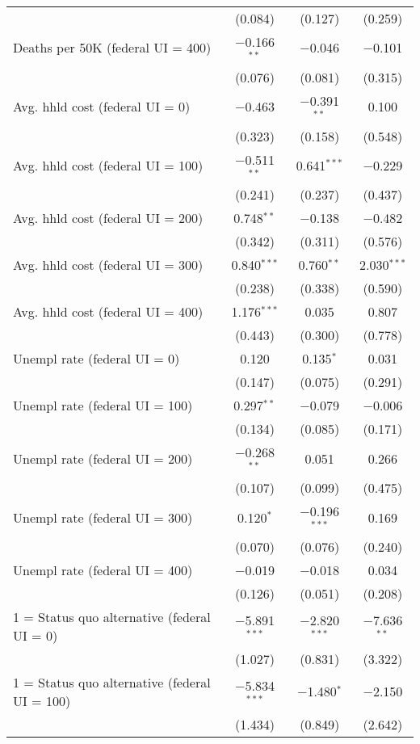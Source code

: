 \begin{table}[!htbp]
\begin{tabular}{@{\extracolsep{5pt}}lccc}
  & (0.084) & (0.127) & (0.259) \\ 
  Deaths per 50K (federal UI = 400) & $-$0.166$^{**}$ & $-$0.046 & $-$0.101 \\ 
  & (0.076) & (0.081) & (0.315) \\ 
  Avg. hhld cost (federal UI = 0) & $-$0.463 & $-$0.391$^{**}$ & 0.100 \\ 
  & (0.323) & (0.158) & (0.548) \\ 
  Avg. hhld cost (federal UI = 100) & $-$0.511$^{**}$ & 0.641$^{***}$ & $-$0.229 \\ 
  & (0.241) & (0.237) & (0.437) \\ 
  Avg. hhld cost (federal UI = 200) & 0.748$^{**}$ & $-$0.138 & $-$0.482 \\ 
  & (0.342) & (0.311) & (0.576) \\ 
  Avg. hhld cost (federal UI = 300) & 0.840$^{***}$ & 0.760$^{**}$ & 2.030$^{***}$ \\ 
  & (0.238) & (0.338) & (0.590) \\ 
  Avg. hhld cost (federal UI = 400) & 1.176$^{***}$ & 0.035 & 0.807 \\ 
  & (0.443) & (0.300) & (0.778) \\ 
  Unempl rate (federal UI = 0) & 0.120 & 0.135$^{*}$ & 0.031 \\ 
  & (0.147) & (0.075) & (0.291) \\ 
  Unempl rate (federal UI = 100) & 0.297$^{**}$ & $-$0.079 & $-$0.006 \\ 
  & (0.134) & (0.085) & (0.171) \\ 
  Unempl rate (federal UI = 200) & $-$0.268$^{**}$ & 0.051 & 0.266 \\ 
  & (0.107) & (0.099) & (0.475) \\ 
  Unempl rate (federal UI = 300) & 0.120$^{*}$ & $-$0.196$^{***}$ & 0.169 \\ 
  & (0.070) & (0.076) & (0.240) \\ 
  Unempl rate (federal UI = 400) & $-$0.019 & $-$0.018 & 0.034 \\ 
  & (0.126) & (0.051) & (0.208) \\ 
  1 = Status quo alternative (federal UI = 0) & $-$5.891$^{***}$ & $-$2.820$^{***}$ & $-$7.636$^{**}$ \\ 
  & (1.027) & (0.831) & (3.322) \\ 
  1 = Status quo alternative (federal UI = 100) & $-$5.834$^{***}$ & $-$1.480$^{*}$ & $-$2.150 \\ 
  & (1.434) & (0.849) & (2.642) \\ 

\end{tabular}
\end{table}
